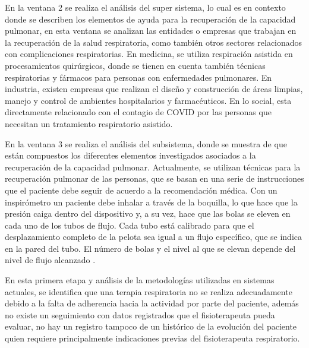 \documentclass[12pt]{article}
\begin{document}
En la ventana 2 se realiza el  análisis del super sistema, lo cual es en contexto donde se describen los elementos de ayuda para la recuperación de la capacidad pulmonar, en esta ventana se analizan las entidades o empresas que trabajan en la recuperación de la salud respiratoria, como también otros sectores relacionados con complicaciones respiratorias. En medicina, se utiliza respiración asistida en procesamientos quirúrgicos, donde se tienen en cuenta también técnicas respiratorias y fármacos para personas con enfermedades pulmonares. En industria, existen empresas que realizan el diseño y construcción de áreas limpias, manejo y control de ambientes hospitalarios y farmacéuticos. En lo social, esta directamente relacionado con el contagio de COVID por las personas que necesitan un tratamiento respiratorio asistido.


En la ventana 3 se realiza el  análisis del subsistema, donde se muestra de que están compuestos los diferentes elementos  investigados asociados a la recuperación de la capacidad pulmonar. Actualmente, se utilizan técnicas para la recuperación pulmonar de las personas, que se basan en una serie de instrucciones que el paciente debe seguir de acuerdo a la recomendación médica. Con un inspirómetro un paciente debe inhalar a través de la boquilla, lo que hace que la presión caiga dentro del dispositivo y, a su vez, hace que las bolas se eleven en cada uno de los tubos de flujo. Cada tubo está calibrado para que el desplazamiento completo de la pelota sea igual a un flujo específico, que se indica en la pared del tubo. El número de bolas y el nivel al que se elevan depende del nivel de flujo alcanzado \cite{38}. 




En esta primera etapa y análisis de la metodologías utilizadas en sistemas actuales, se identifica que una terapia respiratoria no se realiza adecuadamente debido a la falta de adherencia hacia la actividad por parte del paciente, además no existe un seguimiento con datos registrados que el fisioterapeuta pueda evaluar, no hay un registro tampoco de un histórico de la evolución del paciente quien requiere principalmente indicaciones previas del fisioterapeuta respiratorio.
\end{document}

